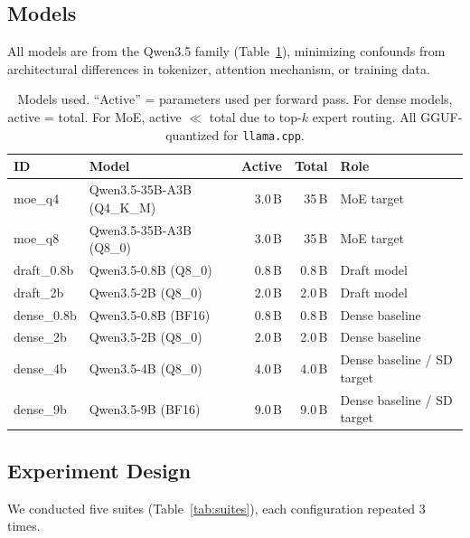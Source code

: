 \documentclass[11pt,a4paper]{article}
\begin{document}
\subsection{Models}

All models are from the Qwen3.5 family (Table~\ref{tab:models}), minimizing confounds from architectural differences in tokenizer, attention mechanism, or training data.

\begin{table}[h]
\centering
\caption{Models used. ``Active'' = parameters used per forward pass. For dense models, active = total. For MoE, active $\ll$ total due to top-$k$ expert routing. All GGUF-quantized for \texttt{llama.cpp}.}
\label{tab:models}
\begin{tabular}{@{}llrrl@{}}
\toprule
\textbf{ID} & \textbf{Model} & \textbf{Active} & \textbf{Total} & \textbf{Role} \\
\midrule
moe\_q4   & Qwen3.5-35B-A3B (Q4\_K\_M)  & 3.0\,B & 35\,B & MoE target \\
moe\_q8   & Qwen3.5-35B-A3B (Q8\_0)     & 3.0\,B & 35\,B & MoE target \\
draft\_0.8b & Qwen3.5-0.8B (Q8\_0)       & 0.8\,B & 0.8\,B & Draft model \\
draft\_2b  & Qwen3.5-2B (Q8\_0)          & 2.0\,B & 2.0\,B & Draft model \\
dense\_0.8b & Qwen3.5-0.8B (BF16)        & 0.8\,B & 0.8\,B & Dense baseline \\
dense\_2b  & Qwen3.5-2B (Q8\_0)          & 2.0\,B & 2.0\,B & Dense baseline \\
dense\_4b  & Qwen3.5-4B (Q8\_0)          & 4.0\,B & 4.0\,B & Dense baseline / SD target \\
dense\_9b  & Qwen3.5-9B (BF16)           & 9.0\,B & 9.0\,B & Dense baseline / SD target \\
\bottomrule
\end{tabular}
\end{table}

\subsection{Experiment Design}

We conducted five suites (Table~\ref{tab:suites}), each configuration repeated 3 times.
\end{document}
